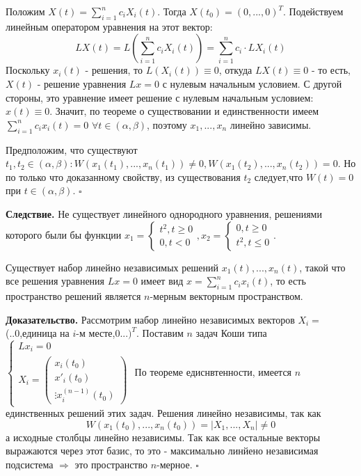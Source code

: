 Положим $X(t) = \sum\limits_{i=1}^{n} c_iX_i(t)$. Тогда 
$X(t_0)=(0,...,0)^T$. Подействуем линейным оператором уравнения на этот вектор:
$$LX(t)=L\left(  \sum\limits_{i=1}^{n} c_iX_i(t)\right) = 
\sum\limits_{i=1}^{n} c_i\cdot LX_i(t)$$
Поскольку $x_i(t)$ - решения, то  $L(X_i(t))\equiv 0$, откуда $LX(t)\equiv0$ - 
то есть, $X(t)$ - решение уравнения  $Lx=0$ с нулевым начальным условием.
С другой стороны, это уравнение имеет решение с нулевым начальным 
условием: $x(t)\equiv 0$. Значит, по теореме о существовании и 
единственности имеем $\sum\limits_{i=1}^{n} c_ix_i(t)=0$ 
$\forall  t\in (\alpha,\beta)$, поэтому $x_1,...,x_n$ линейно зависимы. 

Предположим, что существуют $t_1,t_2\in (\alpha,\beta):
W(x_1(t_1),...,x_n(t_1))\ne 0,W(x_1(t_2),...,x_n(t_2))=0$. 
Но по только что доказанному свойству, из существования $t_2$ следует,что 
$W(t)=0$ при $t\in (\alpha,\beta)$. 
$\square$ 


\textbf{Следствие.} Не существует линейного однородного уравнения, решениями
которого были бы функции 
$x_1=\begin{cases}   t^2,t\geqslant 0\\0,t<0 \end{cases},
x_2=\begin{cases} 0,t\geqslant 0\\t^2,t\leqslant 0 \end{cases}$. 
\begin{theor}
Существует набор линейно независимых решений $x_1(t),...,x_n(t)$, такой что
все решения уравнения $Lx=0$ имеет вид  $x=\sum\limits_{i=1}^n c_ix_i(t)$, то 
есть пространство решений является $n$-мерным векторным пространством. 
\end{theor}
\textbf{Доказательство.}  Рассмотрим набор линейно независимых 
векторов $X_i=$(..0,единица на $i$-м месте,0...$)^T$. Поставим $n$ задач
Коши типа
$\begin{cases}
    Lx_i=0\\
    X_i = 
    \begin{pmatrix} x_i(t_0)\\x'_i(t_0)\\ \vdots x^{(n-1)}_i(t_0)\end{pmatrix} 
\end{cases}$
По теореме едиснвтенности, имеется $n$ единственных решений этих задач. 
Решения линейно независимы, так как
$$W(x_1(t_0),...,x_n(t_0))=\Big|X_1,...,X_n\Big|\ne 0$$ 
а исходные столбцы линейно независимы. Так как все остальные векторы
выражаются через этот базис, то это - максимально линйено независимая
подсистема $\Rightarrow$ это пространство $n$-мерное. $\square$ 

